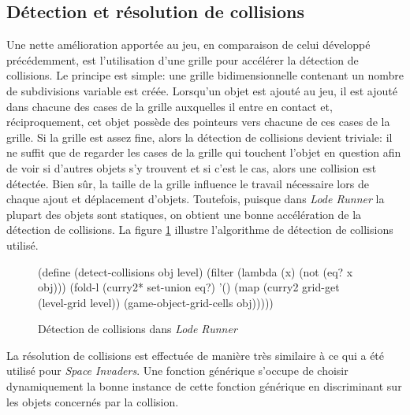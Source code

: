 \documentclass[12pt,twoside,letterpaper,francais]{book}
\newcommand{\scheme}[1]{\selectlanguage{english}{\tt #1}\selectlanguage{french}}
\begin{document}
\subsection{Détection et résolution de collisions}
Une nette amélioration apportée au jeu, en comparaison de celui
développé précédemment, est l'utilisation d'une grille pour accélérer
la détection de collisions. Le principe est simple: une grille
bidimensionnelle contenant un nombre de subdivisions variable est
créée. Lorsqu'un objet est ajouté au jeu, il est ajouté dans chacune
des cases de la grille auxquelles il entre en contact et,
réciproquement, cet objet possède des pointeurs vers chacune de ces
cases de la grille. Si la grille est assez fine, alors la détection de
collisions devient triviale: il ne suffit que de regarder les cases de
la grille qui touchent l'objet en question afin de voir si d'autres
objets s'y trouvent et si c'est le cas, alors une collision est
détectée. Bien sûr, la taille de la grille influence le travail
nécessaire lors de chaque ajout et déplacement d'objets. Toutefois,
puisque dans \textit{Lode Runner} la plupart des objets sont
statiques, on obtient une bonne accélération de la détection de
collisions. La figure \ref{Exp:lr-col-detection} illustre l'algorithme
de détection de collisions utilisé.\\

\begin{figure}[htb!]
  \begin{schemecode}
(define (detect-collisions obj level)
  (filter (lambda (x) (not (eq? x obj)))
          (fold-l (curry2* set-union eq?)
                  '()
                  (map (curry2 grid-get (level-grid level))
                       (game-object-grid-cells obj)))))
  \end{schemecode}
  \caption{Détection de collisions dans \textit{Lode Runner}}
  \label{Exp:lr-col-detection}
\end{figure}

La résolution de collisions est effectuée de manière très similaire à
ce qui a été utilisé pour \textit{Space Invaders}. Une fonction
générique \scheme{resolve-collision} s'occupe de choisir dynamiquement
la bonne instance de cette fonction générique en discriminant sur les
objets concernés par la collision.


\FloatBarrier
\end{document}
